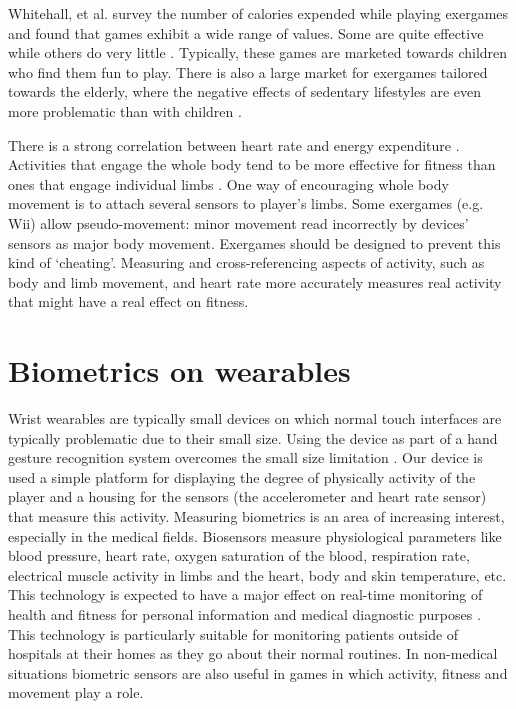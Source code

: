 \documentclass{SIGCHI2015LaTex/sigchi}
\begin{document}
Whitehall, et al. survey the number of calories expended while playing exergames and found that games exhibit a wide range of values. Some are quite effective while others do very little \cite{whitehead2010exergame}. Typically, these games are marketed towards children who find them fun to play. There is also a large market for exergames tailored towards the elderly, where the negative effects of sedentary lifestyles are even more problematic than with children \cite{vonstad2014exergaming}.

There is a strong correlation between heart rate and energy expenditure \cite{whitehead2010exergame}. Activities that engage the whole body tend to be more effective for fitness than ones that engage individual limbs \cite{mortazavi2014near}. One way of encouraging whole body movement is to attach several sensors to player's limbs. Some exergames (e.g. Wii) allow pseudo-movement: minor movement read incorrectly by devices' sensors as major body movement. Exergames should be designed to prevent this kind of `cheating'. Measuring and cross-referencing aspects of activity, such as body and limb movement, and heart rate more accurately measures real activity that might have a real effect on fitness.  

\section{Biometrics on wearables}
Wrist wearables are typically small devices on which normal touch interfaces are typically problematic due to their small size. Using the device as part of a hand gesture recognition system overcomes the small size limitation \cite{kim2007gesture}. Our device is used a simple platform for displaying the degree of physically activity of the player and a housing for the sensors (the accelerometer and heart rate sensor) that measure this activity. Measuring biometrics is an area of increasing interest, especially in the medical fields. Biosensors measure physiological parameters like blood pressure, heart rate, oxygen saturation of the blood, respiration rate, electrical muscle activity in limbs and the heart, body and skin temperature, etc. This technology is expected to have a major effect on real-time monitoring of health and fitness for personal information and medical diagnostic purposes  \cite{pantelopoulos2010survey}. This technology is particularly suitable for monitoring patients outside of hospitals at their homes as they go about their normal routines. In non-medical situations biometric sensors are also useful in games in which activity, fitness and movement play a role.  
\end{document}
